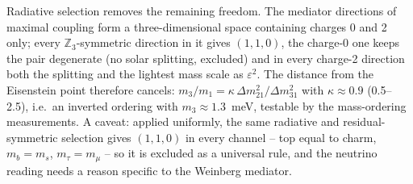 Radiative selection removes the remaining freedom. The mediator directions of maximal coupling form a three-dimensional space containing charges 0 and 2 only; every $\mathbb Z_3$-symmetric direction in it gives $(1,1,0)$, the charge-0 one keeps the pair degenerate (no solar splitting, excluded) and in every charge-2 direction both the splitting and the lightest mass scale as $\varepsilon^2$. The distance from the Eisenstein point therefore cancels: $m_3/m_1=\kappa\,{\Delta m^2_{21}}/{\Delta m^2_{31}}$ with $\kappa\approx0.9$ (0.5--2.5), i.e.\ an inverted ordering with $m_3\approx1.3$~meV, testable by the mass-ordering measurements.  A caveat: applied uniformly, the same radiative and residual-symmetric selection gives $(1,1,0)$ in every channel -- top equal to charm, $m_b=m_s$, $m_\tau=m_\mu$ -- so it is excluded as a universal rule, and the neutrino reading needs a reason specific to the Weinberg mediator. 

